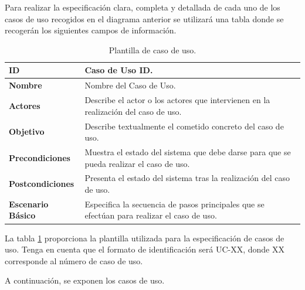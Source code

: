 Para realizar la especificación clara, completa y detallada de cada uno de los casos de uso recogidos en el diagrama anterior se utilizará una tabla donde se recogerán los siguientes campos de información.

\begin{center}
\begin{table}[htbp]
\centering
\begin{tabular}{@{}p{2.5cm} p{9cm}@{}} 
\toprule
\textbf{ID}	& Caso de Uso ID.  \\
\midrule
\textbf{Nombre} 		& Nombre del Caso de Uso.   \\
\midrule
\textbf{Actores} 		&	Describe el actor o los actores que intervienen en la realización del caso de uso.  \\
\midrule
\textbf{Objetivo} 	&	Describe textualmente el cometido concreto del caso de uso. 	 \\
\midrule
\textbf{Precondiciones}	&	Muestra el estado del sistema que debe darse para que se pueda realizar el caso de uso.   \\
\midrule
\textbf{Postcondiciones} 	&	Presenta el estado del sistema tras la realización del caso de uso.   \\
\midrule
\textbf{Escenario Básico} 	&  Especifica la secuencia de pasos principales que se efectúan para realizar el caso de uso. \\
\bottomrule
\end{tabular}
\caption{Plantilla de caso de uso.}
\label{tab:uc_template}
\end{table}
\end{center}

La tabla \ref{tab:uc_template} proporciona la plantilla utilizada para la especificación de casos de uso. Tenga en cuenta que el formato de identificación será UC-XX, donde XX corresponde al número de caso de uso. 

A continuación, se exponen los casos de uso.

